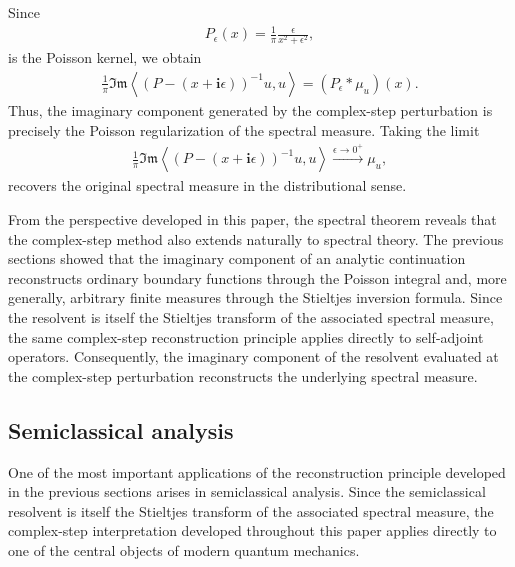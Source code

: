 \documentclass[11pt]{article}
\newcommand{\imag}{\textbf{i}}
\newcommand{\ImagPart}{\mathfrak{Im}}
\begin{document}
    Since
    \begin{align}
    	P_{\epsilon}(x)
    	=
    	\frac{1}{\pi}
    	\frac{\epsilon}{x^2+\epsilon^2},
    \end{align}
    is the Poisson kernel, we obtain
    \begin{align}
    	\frac{1}{\pi}
    	\ImagPart
    	\left\langle
    	\left(P-(x+\imag\epsilon)\right)^{-1}u,u
    	\right\rangle
    	=
    	\left(P_{\epsilon}*\mu_u\right)(x).
    \end{align}
    Thus, the imaginary component generated by the complex-step perturbation is precisely the Poisson regularization of the spectral measure. Taking the limit
    \begin{align}
    	\frac{1}{\pi}
    	\ImagPart
    	\left\langle
    	\left(P-(x+\imag\epsilon)\right)^{-1}u,u
    	\right\rangle
    	\xrightarrow{\epsilon\to0^+}
    	\mu_u,
    	\label{eq.spectral_measure_distribution}
    \end{align}
    recovers the original spectral measure in the distributional sense.
        
    From the perspective developed in this paper, the spectral theorem reveals that the complex-step method also extends naturally to spectral theory. The previous sections showed that the imaginary component of an analytic continuation reconstructs ordinary boundary functions through the Poisson integral and, more generally, arbitrary finite measures through the Stieltjes inversion formula. Since the resolvent is itself the Stieltjes transform of the associated spectral measure, the same complex-step reconstruction principle applies directly to self-adjoint operators. Consequently, the imaginary component of the resolvent evaluated at the complex-step perturbation reconstructs the underlying spectral measure.
        
    \subsection{Semiclassical analysis}
       
    One of the most important applications of the reconstruction principle developed in the previous sections arises in semiclassical analysis. Since the semiclassical resolvent is itself the Stieltjes transform of the associated spectral measure, the complex-step interpretation developed throughout this paper applies directly to one of the central objects of modern quantum mechanics.
    
\end{document}
